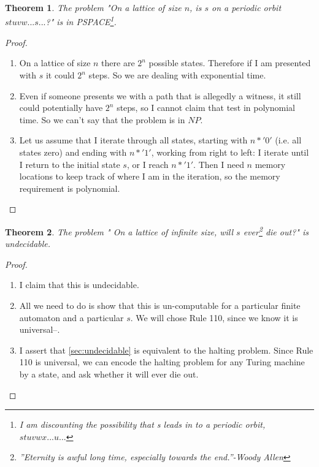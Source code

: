 \documentclass[]{article}
\newtheorem{thm}{Theorem}
\begin{document}
\begin{thm}
	The problem "On a lattice of size $n$, is $s$ on a periodic orbit $stuvw...s...$?" is in PSPACE\footnote{I am discounting the possibility that s \emph{leads in to} a periodic orbit, $stuvwx...u...$}.
\end{thm}

\begin{proof}
	\begin{enumerate}
		\item On a lattice of size $n$ there are $2^n$ possible states. Therefore if I am presented with $s$ it could  $2^n$ steps. So we are dealing with exponential time.
		\item Even if someone presents we with a path that is allegedly a witness, it still could potentially have $2^n$ steps, so I cannot claim that test in polynomial time. So we can't say that the problem is in $NP$.
		\item Let us assume that I iterate through all states, starting with $n*'0'$ (i.e. all states zero) and ending with $n*'1'$, working from right to left: I iterate until I return to the initial state $s$, or I reach $n*'1'$. Then I need $n$ memory locations to keep track of where I am in the iteration, so the memory requirement is polynomial. 
	\end{enumerate}
\end{proof}

\begin{thm}
	The problem " On a lattice of infinite size, will $s$ ever\footnote{''Eternity is awful long time, especially towards the end.''-Woody Allen} die out?" is undecidable.
\end{thm}

\begin{proof}
		\begin{enumerate}
		\item I claim that this is undecidable\label{sec:undecidable}.
		\item All we need to do is show that this is un-computable for a particular finite automaton and a particular $s$. We will chose Rule 110, since we know it is universal--\cite{cook2004universality}.
		\item  I assert that \ref{sec:undecidable} is equivalent to the halting problem. Since Rule 110 is universal, we can encode the halting problem for any Turing machine by a state, and ask whether it will ever die out. 
	\end{enumerate}
\end{proof}





\raggedright
{}

\end{document}
